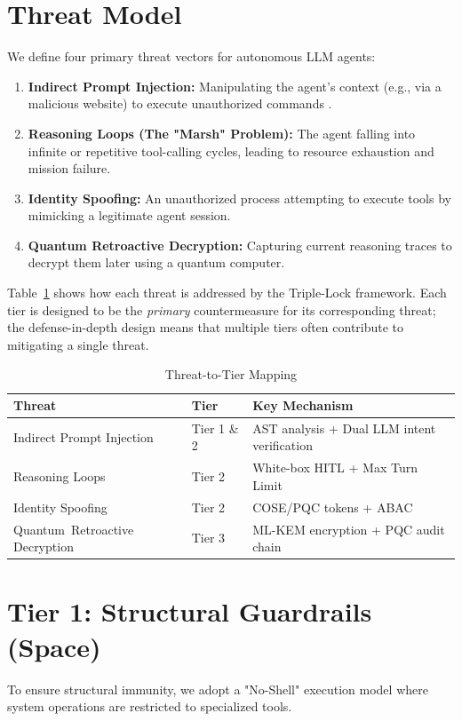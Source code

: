 \documentclass[conference]{IEEEtran}
\begin{document}
\section{Threat Model}
We define four primary threat vectors for autonomous LLM agents:
\begin{enumerate}
    \item \textbf{Indirect Prompt Injection:} Manipulating the agent's context (e.g., via a malicious website) to execute unauthorized commands \cite{greshake2023not}.
    \item \textbf{Reasoning Loops (The "Marsh" Problem):} The agent falling into infinite or repetitive tool-calling cycles, leading to resource exhaustion and mission failure.
    \item \textbf{Identity Spoofing:} An unauthorized process attempting to execute tools by mimicking a legitimate agent session.
    \item \textbf{Quantum Retroactive Decryption:} Capturing current reasoning traces to decrypt them later using a quantum computer.
\end{enumerate}

Table~\ref{tab:threat_mapping} shows how each threat is addressed by the Triple-Lock framework. Each tier is designed to be the \textit{primary} countermeasure for its corresponding threat; the defense-in-depth design means that multiple tiers often contribute to mitigating a single threat.

\begin{table}[htbp]
\caption{Threat-to-Tier Mapping}
\centering
\begin{tabularx}{\columnwidth}{|X|p{1.6cm}|X|}
\hline
\textbf{Threat} & \textbf{Tier} & \textbf{Key Mechanism} \\
\hline
Indirect Prompt Injection & Tier 1 \& 2 & AST analysis + Dual LLM intent verification \\
Reasoning Loops & Tier 2 & White-box HITL + Max Turn Limit \\
Identity Spoofing & Tier 2 & COSE/PQC tokens + ABAC \\
\mbox{Quantum Retroactive} \mbox{Decryption} & Tier 3 & ML-KEM encryption + PQC audit chain \\
\hline
\end{tabularx}
\label{tab:threat_mapping}
\end{table}

\section{Tier 1: Structural Guardrails (Space)}
To ensure structural immunity, we adopt a "No-Shell" execution model where system operations are restricted to specialized tools.
\end{document}
